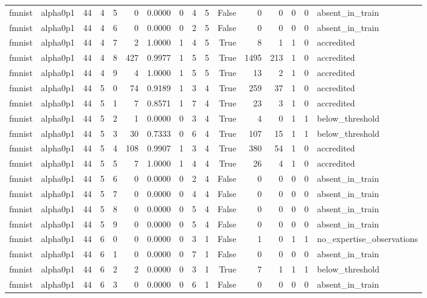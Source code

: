 \begin{tabular}{llrrrrrrrrrrrrrl}
fmnist & alpha0p1 & 44 & 4 & 5 & 0 & 0.0000 & 0 & 4 & 5 & False & 0 & 0 & 0 & 0 & absent\_in\_train \\
fmnist & alpha0p1 & 44 & 4 & 6 & 0 & 0.0000 & 0 & 2 & 5 & False & 0 & 0 & 0 & 0 & absent\_in\_train \\
fmnist & alpha0p1 & 44 & 4 & 7 & 2 & 1.0000 & 1 & 4 & 5 & True & 8 & 1 & 1 & 0 & accredited \\
fmnist & alpha0p1 & 44 & 4 & 8 & 427 & 0.9977 & 1 & 5 & 5 & True & 1495 & 213 & 1 & 0 & accredited \\
fmnist & alpha0p1 & 44 & 4 & 9 & 4 & 1.0000 & 1 & 5 & 5 & True & 13 & 2 & 1 & 0 & accredited \\
fmnist & alpha0p1 & 44 & 5 & 0 & 74 & 0.9189 & 1 & 3 & 4 & True & 259 & 37 & 1 & 0 & accredited \\
fmnist & alpha0p1 & 44 & 5 & 1 & 7 & 0.8571 & 1 & 7 & 4 & True & 23 & 3 & 1 & 0 & accredited \\
fmnist & alpha0p1 & 44 & 5 & 2 & 1 & 0.0000 & 0 & 3 & 4 & True & 4 & 0 & 1 & 1 & below\_threshold \\
fmnist & alpha0p1 & 44 & 5 & 3 & 30 & 0.7333 & 0 & 6 & 4 & True & 107 & 15 & 1 & 1 & below\_threshold \\
fmnist & alpha0p1 & 44 & 5 & 4 & 108 & 0.9907 & 1 & 3 & 4 & True & 380 & 54 & 1 & 0 & accredited \\
fmnist & alpha0p1 & 44 & 5 & 5 & 7 & 1.0000 & 1 & 4 & 4 & True & 26 & 4 & 1 & 0 & accredited \\
fmnist & alpha0p1 & 44 & 5 & 6 & 0 & 0.0000 & 0 & 2 & 4 & False & 0 & 0 & 0 & 0 & absent\_in\_train \\
fmnist & alpha0p1 & 44 & 5 & 7 & 0 & 0.0000 & 0 & 4 & 4 & False & 0 & 0 & 0 & 0 & absent\_in\_train \\
fmnist & alpha0p1 & 44 & 5 & 8 & 0 & 0.0000 & 0 & 5 & 4 & False & 0 & 0 & 0 & 0 & absent\_in\_train \\
fmnist & alpha0p1 & 44 & 5 & 9 & 0 & 0.0000 & 0 & 5 & 4 & False & 0 & 0 & 0 & 0 & absent\_in\_train \\
fmnist & alpha0p1 & 44 & 6 & 0 & 0 & 0.0000 & 0 & 3 & 1 & False & 1 & 0 & 1 & 1 & no\_expertise\_observations \\
fmnist & alpha0p1 & 44 & 6 & 1 & 0 & 0.0000 & 0 & 7 & 1 & False & 0 & 0 & 0 & 0 & absent\_in\_train \\
fmnist & alpha0p1 & 44 & 6 & 2 & 2 & 0.0000 & 0 & 3 & 1 & True & 7 & 1 & 1 & 1 & below\_threshold \\
fmnist & alpha0p1 & 44 & 6 & 3 & 0 & 0.0000 & 0 & 6 & 1 & False & 0 & 0 & 0 & 0 & absent\_in\_train \\

\end{tabular}

